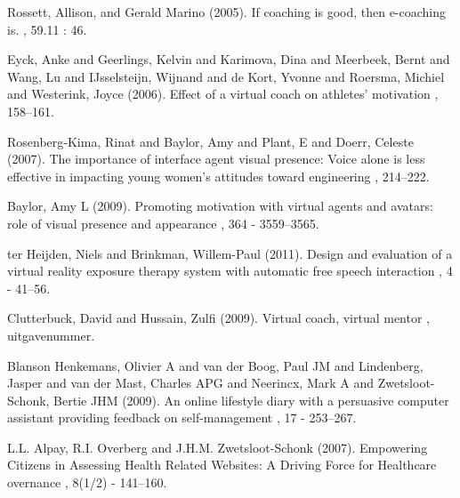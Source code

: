 \documentclass[twoside]{article}
\begin{document}
\begin{multicols}{2}
\begin{thebibliography}{99}


Rossett, Allison, and Gerald Marino (2005).
\newblock If coaching is good, then e-coaching is.
, 59.11 : 46.

Eyck, Anke and Geerlings, Kelvin and Karimova, Dina and Meerbeek, Bernt and Wang, Lu and IJsselsteijn, Wijnand and de Kort, Yvonne and Roersma, Michiel and Westerink, Joyce (2006).
\newblock Effect of a virtual coach on athletes’ motivation
, 158--161.


Rosenberg-Kima, Rinat and Baylor, Amy and Plant, E and Doerr, Celeste (2007).
\newblock The importance of interface agent visual presence: Voice alone is less effective in impacting young women’s attitudes toward engineering
, 214--222.


Baylor, Amy L (2009).
\newblock Promoting motivation with virtual agents and avatars: role of visual presence and appearance
, 364 - 3559--3565.


ter Heijden, Niels and Brinkman, Willem-Paul (2011).
\newblock Design and evaluation of a virtual reality exposure therapy system with automatic free speech interaction
, 4 - 41--56.


Clutterbuck, David and Hussain, Zulfi (2009).
\newblock Virtual coach, virtual mentor
, uitgavenummer.


Blanson Henkemans, Olivier A and van der Boog, Paul JM and Lindenberg, Jasper and van der Mast, Charles APG and Neerincx, Mark A and Zwetsloot-Schonk, Bertie JHM (2009).
\newblock An online lifestyle diary with a persuasive computer assistant providing feedback on self-management
, 17 - 253--267.


L.L. Alpay, R.I. Overberg and J.H.M. Zwetsloot-Schonk (2007).
\newblock Empowering Citizens in Assessing Health Related Websites: A Driving Force for Healthcare overnance
, 8(1/2) - 141--160.



\end{thebibliography}


\end{multicols}
\end{document}
